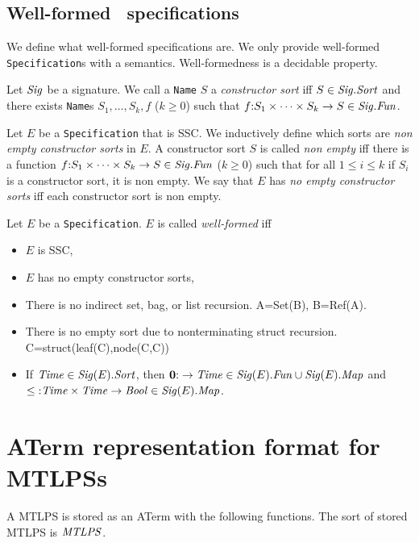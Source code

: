 \documentclass[fleqn,a4paper,dvips]{article}
\newcommand{\Sig}{\nm{Sig}}
\newcommand{\Fun}{\nm{Fun}}
\newcommand{\nul}{{\bf 0}}
\begin{document}
\subsection{Well-formed \mcrl\ specifications}
We define what well-formed specifications are. We only provide
well-formed {\tt Specification}s with a semantics. Well-formedness
is a decidable property.
\begin{defn}
Let $\Sig$ be a signature. We call a {\tt Name} $S$ a {\it constructor sort}
iff $S\in\Sig.\Sort$ and there exists {\tt Name}s $S_1,\ldots, S_k, f$ ($k\geq 0$)
such that $f\ap S_1\times \cdots\times S_k\rightarrow S\in \Sig.\Fun$.
\end{defn}
\begin{defn}
Let $E$ be a {\tt Specification} that is SSC. 
We inductively define which sorts are {\it non empty constructor sorts} in $E$.
A constructor sort $S$ is called {\it non empty} iff there is a function
$f\ap S_1\times\cdots\times S_k\rightarrow S\in \Sig.\Fun$ ($k\geq 0$) such
that for all $1\leq i\leq k$ if $S_i$ is a constructor sort, it is non empty.
We say
that $E$ has {\em no empty constructor sorts} iff each constructor sort is non
empty.
\end{defn}
\begin{defn}
Let $E$ be a {\tt Specification}. $E$ is called {\it well-formed} iff 
\begin{itemize}
\item $E$ is SSC, 
\item $E$ has no empty constructor sorts,
\item There is no indirect set, bag, or list recursion. A=Set(B), B=Ref(A).
\item There is no empty sort due to nonterminating struct recursion.
  C=struct(leaf(C),node(C,C))
\item If $\Time\in\Sig(E).\Sort$, then $\nul\ap \rightarrow\Time\in\Sig(E).\Fun\cup \Sig(E).\Map$
  and $\leq\ap\Time\times\Time\rightarrow\Bool\in \Sig(E).\Map$.
\end{itemize}
\end{defn}

\newpage
\section{ATerm representation format for MTLPSs}
A MTLPS is stored as an ATerm with the following functions. The sort
of stored MTLPS is $\mathit{MTLPS}$.
\end{document}

